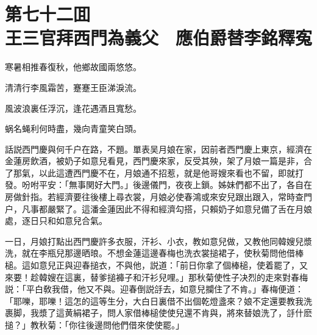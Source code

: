 
\chapter*{第七十二囬　\\王三官拜西門為義父　應伯爵替李銘釋寃}


\begin{myquote}
寒暑相推春復秋，他鄉故國兩悠悠。

清清行李風霜苦，蹇蹇王臣涕淚流。

風波浪裏任浮沉，逢花遇酒且寬愁。

蜗名蝇利何時盡，幾向青童笑白頭。
\end{myquote}

話説西門慶與何千户在路，不題。單表吴月娘在家，因前者西門慶上東京，經濟在金蓮房飲酒，被奶子如意兒看見，西門慶來家，反受其殃，架了月娘一篇是非，合了那氣，以此這遭西門慶不在，月娘通不招惹，就是他哥嫂來看也不留，即就打發。吩咐平安：「無事関好大門。」後邊儀門，夜夜上鎖。姊妹們都不出了，各自在房做針指。若經濟要往後樓上尋衣裳，月娘必使春鴻或來安兒跟出跟入，常時查門户，凡事都嚴緊了。這潘金蓮因此不得和經濟勾搭，只賴奶子如意兒備了舌在月娘處，逐日只和如意兒合氣。

一日，月娘打點出西門慶許多衣服，汗衫、小衣，教如意兒做，又教他同韓嫂兒漿洗，就在李瓶兒那邊晒㫰。不想金蓮這邊春梅也洗衣裳搥裙子，使秋菊問他借棒槌。這如意兒正與迎春搥衣，不與他，説道：「前日你拿了個棒槌，使着罷了，又來要！趁韓嫂在這裏，替爹搥褲子和汗衫兒哩。」那秋菊使性子决烈的走來對春梅説：「平白敎我借，他又不與。迎春倒説㧱去，如意兒攔住了不肯。」春梅便道：「耶嚛，耶嚛！這怎的這等生分，大白日裏借不出個乾燈盞來？娘不定還要教我洗裹脚，我漿了這黄絹裙子，問人家借棒槌使使兒還不肯與，將來替娘洗了，㧱什麽搥？」教秋菊：「你往後邊問他們借來使使罷。」


